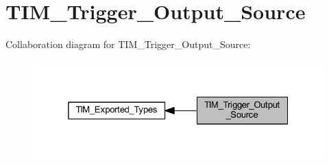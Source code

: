 \hypertarget{group___t_i_m___trigger___output___source}{}\section{T\+I\+M\+\_\+\+Trigger\+\_\+\+Output\+\_\+\+Source}
\label{group___t_i_m___trigger___output___source}
Collaboration diagram for T\+I\+M\+\_\+\+Trigger\+\_\+\+Output\+\_\+\+Source\+:
\nopagebreak
\begin{figure}[H]
\begin{center}
\leavevmode
\includegraphics[width=325pt]{group___t_i_m___trigger___output___source}
\end{center}
\end{figure}
